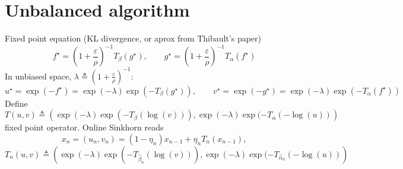 \documentclass[a4paper, 10pt]{article}
\begin{document}
\section{Unbalanced algorithm}

Fixed point equation (KL divergence, or aprox from Thibault's paper)
\begin{equation}
    f^\star = \left( 1 + \frac{\varepsilon}{\rho} \right)^{-1} T_\beta ( g^\star), \qquad
    g^\star = \left( 1 + \frac{\varepsilon}{\rho} \right)^{-1} T_\alpha ( f^\star)
\end{equation}
In unbiased space, $\lambda \triangleq \left( 1 + \frac{\varepsilon}{\rho} \right)^{-1}$:
\begin{equation}
    u^\star = \exp(-f^\star) = \exp(-\lambda) \exp(-T_\beta ( g^\star)), \qquad
    v^\star = \exp(-g^\star) = \exp(-\lambda) \exp(-T_\alpha ( f^\star))
\end{equation}
Define
\begin{equation}
    T(u, v) \triangleq \left(\exp(-\lambda) \exp(-T_\beta (\log(v))),
                    \exp(-\lambda) \exp(-T_\alpha (-\log(u)) \right)
\end{equation}
fixed point operator. Online Sinkhorn reads
\begin{equation}
    x_n = (u_n, v_n) = (1 - \eta_n) x_{n-1} + \eta_n T_n(x_{n-1}),
\end{equation}
\begin{equation}
    T_n(u, v) \triangleq \left(\exp(-\lambda) \exp(-T_{\hat \beta_n} (\log(v))),
                    \exp(-\lambda) \exp(-T_{\hat \alpha_n} (-\log(u)) \right)
\end{equation}

\printbibliography
\end{document}
